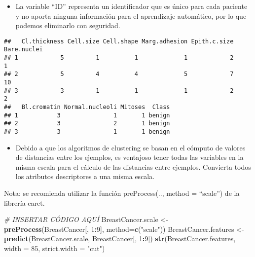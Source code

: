 \documentclass[
]{article}
\newenvironment{Shaded}{\begin{snugshade}}{\end{snugshade}}
\newcommand{\CommentTok}[1]{\textcolor[rgb]{0.56,0.35,0.01}{\textit{#1}}}
\newcommand{\DataTypeTok}[1]{\textcolor[rgb]{0.13,0.29,0.53}{#1}}
\newcommand{\DecValTok}[1]{\textcolor[rgb]{0.00,0.00,0.81}{#1}}
\newcommand{\KeywordTok}[1]{\textcolor[rgb]{0.13,0.29,0.53}{\textbf{#1}}}
\newcommand{\NormalTok}[1]{#1}
\newcommand{\OperatorTok}[1]{\textcolor[rgb]{0.81,0.36,0.00}{\textbf{#1}}}
\newcommand{\OtherTok}[1]{\textcolor[rgb]{0.56,0.35,0.01}{#1}}
\newcommand{\StringTok}[1]{\textcolor[rgb]{0.31,0.60,0.02}{#1}}
\providecommand{\tightlist}{%
  \setlength{\itemsep}{0pt}\setlength{\parskip}{0pt}}
\begin{document}
\begin{itemize}
\tightlist
\item
  La variable ``ID'' representa un identificador que es único para cada
  paciente y no aporta ninguna información para el aprendizaje
  automático, por lo que podemos eliminarlo con seguridad.
\end{itemize}

\begin{Shaded}
\end{Shaded}

\begin{verbatim}
##   Cl.thickness Cell.size Cell.shape Marg.adhesion Epith.c.size Bare.nuclei
## 1            5         1          1             1            2           1
## 2            5         4          4             5            7          10
## 3            3         1          1             1            2           2
##   Bl.cromatin Normal.nucleoli Mitoses  Class
## 1           3               1       1 benign
## 2           3               2       1 benign
## 3           3               1       1 benign
\end{verbatim}

\begin{itemize}
\tightlist
\item
  Debido a que los algoritmos de clustering se basan en el cómputo de
  valores de distancias entre los ejemplos, es ventajoso tener todas las
  variables en la misma escala para el cálculo de las distancias entre
  ejemplos. Convierta todos los atributos descriptores a una misma
  escala.
\end{itemize}

Nota: se recomienda utilizar la función preProcess(.., method =
``scale'') de la librería caret.

\begin{Shaded}
\begin{Highlighting}[]
\CommentTok{# INSERTAR CÓDIGO AQUÍ}
\NormalTok{BreastCancer.scale <-}\StringTok{ }\KeywordTok{preProcess}\NormalTok{(BreastCancer[, }\DecValTok{1}\OperatorTok{:}\DecValTok{9}\NormalTok{], }\DataTypeTok{method=}\KeywordTok{c}\NormalTok{(}\StringTok{"scale"}\NormalTok{))}
\NormalTok{BreastCancer.features <-}\StringTok{ }\KeywordTok{predict}\NormalTok{(BreastCancer.scale, BreastCancer[, }\DecValTok{1}\OperatorTok{:}\DecValTok{9}\NormalTok{])}
\KeywordTok{str}\NormalTok{(BreastCancer.features, }\DataTypeTok{width =} \DecValTok{85}\NormalTok{, }\DataTypeTok{strict.width =} \StringTok{"cut"}\NormalTok{)}
\end{Highlighting}
\end{Shaded}
\end{document}
